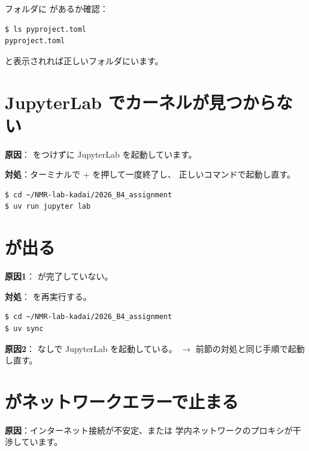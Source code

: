フォルダに  があるか確認：

\begin{wslbox}
\begin{lstlisting}[style=bash]
$ ls pyproject.toml
pyproject.toml
\end{lstlisting}
\end{wslbox}

 と表示されれば正しいフォルダにいます。

\section{JupyterLab でカーネルが見つからない}

\textbf{原因}： をつけずに JupyterLab を起動しています。

\textbf{対処}：ターミナルで  +  を押して一度終了し、
正しいコマンドで起動し直す。

\begin{wslbox}[正しい起動コマンド]
\begin{lstlisting}[style=bash]
$ cd ~/NMR-lab-kadai/2026_B4_assignment
$ uv run jupyter lab
\end{lstlisting}
\end{wslbox}

\section{ が出る}

\textbf{原因1}： が完了していない。

\textbf{対処}： を再実行する。

\begin{wslbox}
\begin{lstlisting}[style=bash]
$ cd ~/NMR-lab-kadai/2026_B4_assignment
$ uv sync
\end{lstlisting}
\end{wslbox}

\textbf{原因2}： なしで JupyterLab を起動している。
$\rightarrow$ 前節の対処と同じ手順で起動し直す。

\section{ がネットワークエラーで止まる}

\textbf{原因}：インターネット接続が不安定、または
学内ネットワークのプロキシが干渉しています。


